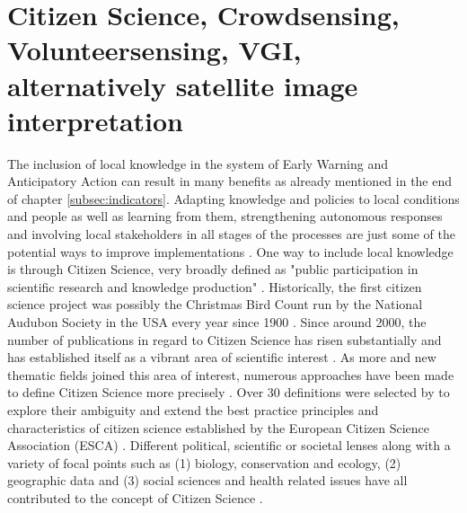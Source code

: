 \section{Citizen Science, Crowdsensing, Volunteersensing, VGI,  alternatively satellite image interpretation}\label{sec:cs}

The inclusion of local knowledge in the system of Early Warning and Anticipatory Action can result in many benefits as already mentioned in the end of chapter \ref*{subsec:indicators}. Adapting knowledge and policies to local conditions and people as well as learning from them, strengthening autonomous responses and involving local stakeholders in all stages of the processes are just some of the potential ways to improve implementations \autocite{giordanoIntegrationLocalScientific2013a,idmpDroughtWaterScarcity2022,lackstromBackyardHydroclimatologyCitizen2022,lealfilhoRoleIndigenousKnowledge2022,lealfilhoUnderstandingResponsesClimaterelated2022}. One way to include local knowledge is through Citizen Science, very broadly defined as "public participation in scientific research and knowledge production" \autocite{fraislCitizenScienceEnvironmental2022} .
Historically, the first citizen science project was possibly the Christmas Bird Count run by the National Audubon Society in the USA every year since 1900 \autocite{linkHierarchicalModelRegional2006,silvertownNewDawnCitizen2009}. Since around 2000, the number of publications in regard to Citizen Science has risen substantially and has established itself as a vibrant area of scientific interest \autocite{kirschkeCitizenScienceProjects2022}. As more and new thematic fields joined this area of interest, numerous approaches have been made to define Citizen Science more precisely \autocite{haklayWhatCitizenScience2021}. Over 30 definitions were selected by \autocite{haklayWhatCitizenScience2021} to explore their ambiguity and extend the best practice principles and characteristics of citizen science established by the European Citizen Science Association (ESCA) \autocite{escaTenPrinciplesCitizen2015,escaECSACharacteristicsCitizen2020}. Different political, scientific or societal lenses along with a variety of focal points such as (1) biology, conservation and ecology, (2) geographic data and (3) social sciences and health related issues have all contributed to the concept of Citizen Science \autocite{haklayWhatCitizenScience2021,kirschkeCitizenScienceProjects2022,kullenbergWhatCitizenScience2016}.
